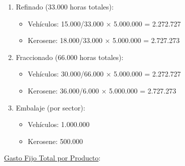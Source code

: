 \documentclass[10pt,a4paper]{article}
\begin{document}
\begin{enumerate}
    \clearpage

    \begin{enumerate}[label=\alph*)]

        \item Refinado (33.000 horas totales):
        
        \begin{itemize}

            \item Vehículos: 15.000/33.000 × 5.000.000 = 2.272.727
            \item Kerosene: 18.000/33.000 × 5.000.000 = 2.727.273 \\
    
        \end{itemize}

        \item Fraccionado (66.000 horas totales):
        
        \begin{itemize}

            \item Vehículos: 30.000/66.000 × 5.000.000 = 2.272.727
            \item Kerosene: 36.000/6.000 × 5.000.000 = 2.727.273 \\
    
        \end{itemize}

        \item Embalaje (por sector):
        
        \begin{itemize}

            \item Vehículos: 1.000.000
            \item Kerosene: 500.000 \\
    
        \end{itemize}

    \end{enumerate}

    \vspace{0.5em}

    \underline{Gasto Fijo Total por Producto}: \\

    \begin{center}
    \end{center}


\end{enumerate}
\end{document}
